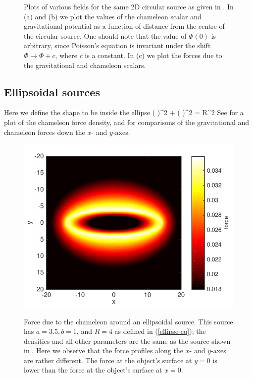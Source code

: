 \documentclass[a4paper, 12pt]{article}
\numberwithin{equation}{section}
\begin{document}
\begin{figure}[!t]
\begin{center}
      \end{center}
\caption{ Plots of various fields for the same 2D circular source as given in . In (a) and (b) we plot the values of the chameleon scalar and gravitational potential as a function of distance from the centre of the circular source. One should note that the value of $\Phi(0)$ is arbitrary, since Poisson's equation is invariant under the shift $\Phi \rightarrow \Phi + c$, where $c$ is a constant. In (c) we plot the forces due to the gravitational and chameleon scalars. }\label{fig:circ-1dplots}
\end{figure}

\subsection{Ellipsoidal sources}
Here we define the shape to be inside the ellipse
\bea
\label{ellipse-eq}
\left( \right)^2 + \left( \right)^2 = R^2
\eea
See  for a plot of the chameleon force density, and  for comparisons of the gravitational and chameleon forces down the $x$- and $y$-axes.

\begin{figure}[!t]
      \begin{center}
{\includegraphics[scale=0.8,angle=0]{images/el_force_final}}
      \end{center}
\caption{ Force due to the chameleon around an ellipsoidal source. This source  has $a = 3.5, b = 1$, and $R=4$ as defined in (\ref{ellipse-eq}); the densities and all other parameters are the same as the source shown in . Here we observe that the force profiles along the $x$- and $y$-axes are rather different. The force at the object's surface at $y=0$ is lower than the force at the object's surface at $x=0$.  }\label{fig:ellip}
\end{figure}
\end{document}
